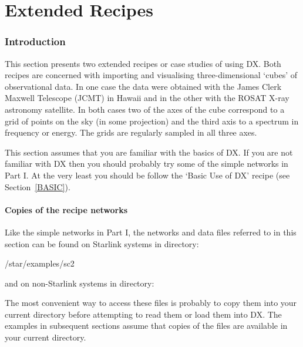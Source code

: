 \documentclass[twoside,11pt]{starlink}
\begin{document}
\cleardoublepage

\part{Extended Recipes}

\section{Introduction}

This section presents two extended recipes or case studies of using
DX.  Both recipes are concerned with importing and visualising
three-dimensional `cubes' of observational data.  In one case the data
were obtained with the James Clerk Maxwell Telescope (JCMT) in Hawaii
and in the other with the ROSAT X-ray astronomy satellite.  In both
cases two of the axes of the cube correspond to a grid of points on
the sky (in some projection) and the third axis to a spectrum in
frequency or energy.  The grids are regularly sampled in all three axes.

This section assumes that you are familiar with the basics of DX.  If
you are not familiar with DX then you should probably try some of
the simple networks in Part I.  At the very least you should be
follow the `Basic Use of DX' recipe (see Section~\ref{BASIC}).

\subsection{Copies of the recipe networks}

Like the simple networks in Part I, the networks and data files referred
to in this section can be found on Starlink systems in directory:

\begin{terminalv}
/star/examples/sc2
\end{terminalv}

and on non-Starlink systems in directory:

The most convenient way to access these files is probably to copy them
into your current directory before attempting to read them or load
them into DX.  The examples in subsequent sections assume that copies
of the files are available in your current directory.
\end{document}
